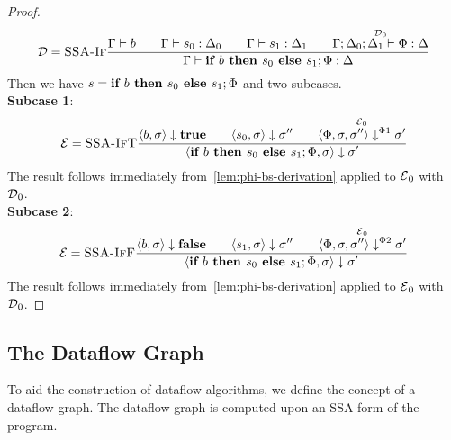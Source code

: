 \begin{proof}
\begin{align*}
        \operatorname{\mathcal{D}} = \textsc{SSA-If}\frac{\displaystyle \Gamma \vdash {b}\qquad
        \Gamma \vdash {s_0}: \Delta_0\qquad \Gamma \vdash {s_1}: \Delta_1\qquad
        \overset{\operatorname{\mathcal{D}}_0}{\Gamma;\Delta_0;\Delta_1 \vdash {\Phi}: \Delta}}{\displaystyle \Gamma \vdash {\textbf{if }{b} \textbf{ then }{s_0}\textbf{ else }{s_1};{\Phi}}: \Delta}
    \end{align*}
    Then we have $s = \textbf{if }{b} \textbf{ then }{s_0}\textbf{ else }{s_1};{\Phi}$ and
    two subcases.\\
    \textbf{Subcase 1}:
    \begin{align*}
        \operatorname{\mathcal{E}} = \textsc{SSA-IfT}\frac{\displaystyle \langle b, \sigma \rangle \downarrow \textbf{true}\qquad \langle s_0, \sigma \rangle \downarrow \sigma''
        \qquad \overset{\operatorname{\mathcal{E}}_0}{\langle \Phi, \sigma, \sigma'' \rangle \downarrow^{\Phi1} \sigma'}}{\displaystyle \langle \textbf{if }{b} \textbf{ then }{s_0}\textbf{ else }{s_1};{\Phi}, \sigma \rangle \downarrow \sigma'}
    \end{align*}
    The result follows immediately from~\autoref{lem:phi-bs-derivation} applied to $\operatorname{\mathcal{E}}_0$ with $\operatorname{\mathcal{D}}_0$.\\
    \textbf{Subcase 2}:
    \begin{align*}
        \operatorname{\mathcal{E}} = \textsc{SSA-IfF}\frac{\displaystyle \langle b, \sigma \rangle \downarrow \textbf{false}\qquad \langle s_1, \sigma \rangle \downarrow \sigma''
        \qquad \overset{\operatorname{\mathcal{E}}_0}{\langle \Phi, \sigma, \sigma'' \rangle \downarrow^{\Phi2} \sigma'}}{\displaystyle \langle \textbf{if }{b} \textbf{ then }{s_0}\textbf{ else }{s_1};{\Phi}, \sigma \rangle \downarrow \sigma'}
    \end{align*}
    The result follows immediately from~\autoref{lem:phi-bs-derivation} applied to $\operatorname{\mathcal{E}}_0$ with $\operatorname{\mathcal{D}}_0$.
\end{proof}
\fi

\iffalse

\subsection{The Dataflow Graph}
To aid the construction of dataflow algorithms, we define the concept
of a dataflow graph.
The dataflow graph is computed upon an SSA form of the program.


